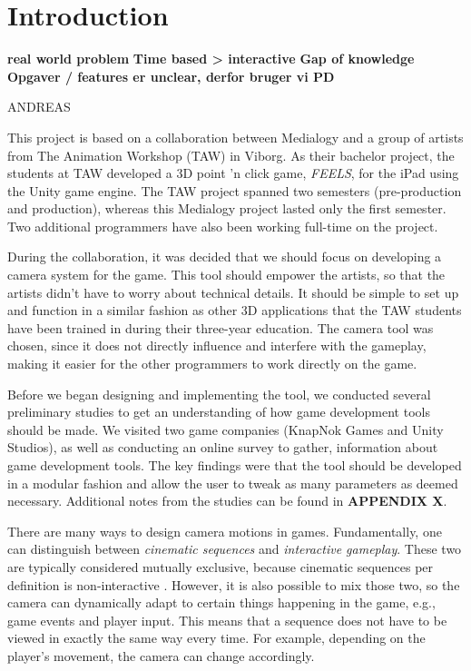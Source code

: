 \section{Introduction}

\textbf{real world problem}
\textbf{Time based > interactive}
\textbf{Gap of knowledge}
\textbf{Opgaver / features er unclear, derfor bruger vi PD}

ANDREAS

This project is based on a collaboration between Medialogy and a group of artists from The Animation Workshop (TAW) in Viborg. As their bachelor project, the students at TAW developed a 3D point 'n click game, \textit{FEELS}, for the iPad using the Unity game engine. The TAW project spanned two semesters (pre-production and production), whereas this Medialogy project lasted only the first semester. Two additional programmers have also been working full-time on the project.

During the collaboration, it was decided that we should focus on developing a camera system for the game. This tool should empower the artists, so that the artists didn't have to worry about technical details. It should be simple to set up and function in a similar fashion as other 3D applications that the TAW students have been trained in during their three-year education. The camera tool was chosen, since it does not directly influence and interfere with the gameplay, making it easier for the other programmers to work directly on the game.

Before we began designing and implementing the tool, we conducted several preliminary studies to get an understanding of how game development tools should be made. We visited two game companies (KnapNok Games and Unity Studios), as well as conducting an online survey to gather, information about game development tools. The key findings were that the tool should be developed in a modular fashion and allow the user to tweak as many parameters as deemed necessary. Additional notes from the studies can be found in \textbf{APPENDIX X}.


There are many ways to design camera motions in games. Fundamentally, one can distinguish between \textit{cinematic sequences} and \textit{interactive gameplay}. These two are typically considered mutually exclusive, because cinematic sequences per definition is non-interactive \cite{haigh-hutchinson_real-time_2009}. However, it is also possible to mix those two, so the camera can dynamically adapt to certain things happening in the game, e.g., game events and player input. This means that a sequence does not have to be viewed in exactly the same way every time. For example, depending on the player's movement, the camera can change accordingly.

